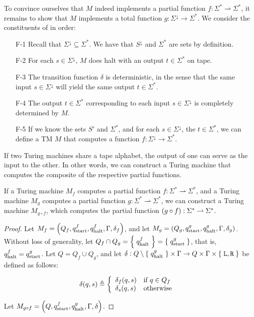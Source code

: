 To convince ourselves that $M$ indeed implements a partial function $f :
\Sigma^* \rightharpoonup \Sigma^*$, it remains to show that $M$ implements a
total function $g : \Sigma^\downarrow \rightarrow \Sigma^*$. We consider the
constituents of  in order:

\begin{enumerate}

\item [F-1] Recall that $\Sigma^\downarrow \subseteq \Sigma^*$. We have that
$S^\downarrow$ and $\Sigma^*$ are sets by definition.

\item [F-2] For each $s\in \Sigma^\downarrow$, $M$ does halt with an output
$t\in\Sigma^*$ on tape.

\item [F-3] The transition function $\delta$ is deterministic, in the sense
that the same input $s \in \Sigma^\downarrow$ will yield the same output $t \in
\Sigma^*$.

\item [F-4] The output $t \in \Sigma^*$ corresponding to each input $s \in
\Sigma^\downarrow$ is completely determined by $M$.

\item [F-5] If we know the sets $S'$ and $\Sigma^*$, and for each $s \in
\Sigma^\downarrow$, the $t \in \Sigma^*$, we can define a TM $M$ that computes
a function $f : \Sigma^\downarrow \rightarrow \Sigma^*$.

\end{enumerate}

If two Turing machines share a tape alphabet, the output of one can serve as
the input to the other. In other words, we can construct a Turing machine that
computes the composite of the respective partial functions.

\begin{theorem} If a Turing machine $M_f$ computes a partial function $f :
\Sigma^* \rightharpoonup \Sigma^*$, and a Turing machine $M_g$ computes a
partial function $g : \Sigma^* \rightharpoonup \Sigma^*$, we can construct a
Turing machine $M_{g \circ f}$, which computes the partial function $\mathopen{}\left({g \circ
f}\right)\mathclose{} : \Sigma^* \rightharpoonup \Sigma^*$. \end{theorem}

\begin{proof} Let $M_f=\mathopen{}\left({Q_f,q_{\text{start}}^f,q_{\text{halt}}^f,\Gamma,\delta_f}\right)\mathclose{}$, and let
$M_g=\mathopen{}\left({Q_g,q_{\text{start}}^g,q_{\text{halt}}^g,\Gamma,\delta_g}\right)\mathclose{}$. Without loss of generality,
let $Q_f \cap Q_g = \mathopen{}\left\{\mathrel{}{q_{\text{halt}}^f}\mathrel{}\right\}\mathclose{} = \mathopen{}\left\{\mathrel{}{q_{\text{start}}^g}\mathrel{}\right\}\mathclose{}$, that is,
$q_{\text{halt}}^f=q_{\text{start}}^g$. Let $Q=Q_f \cup Q_g$, and let $\delta : Q \setminus
\mathopen{}\left\{\mathrel{}{q_{\text{halt}}^g}\mathrel{}\right\}\mathclose{} \times \Gamma \rightarrow Q \times \Gamma \times \mathopen{}\left\{\mathrel{}{\mathtt{L},\mathtt{R}}\mathrel{}\right\}\mathclose{}$ be
defined as follows:

$$\delta\mathopen{}\left({q,s}\right)\mathclose{}\triangleq\left\{
\begin{array}{l l}
\delta_f\mathopen{}\left({q,s}\right)\mathclose{} & \text{if $q\in Q_f$} \\
\delta_s\mathopen{}\left({q,s}\right)\mathclose{} & \text{otherwise}
\end{array}
\right.$$

Let $M_{g \circ f} = \mathopen{}\left({Q, q_{\text{start}}^f, q_{\text{halt}}^g, \Gamma,
\delta}\right)\mathclose{}$.\end{proof}

